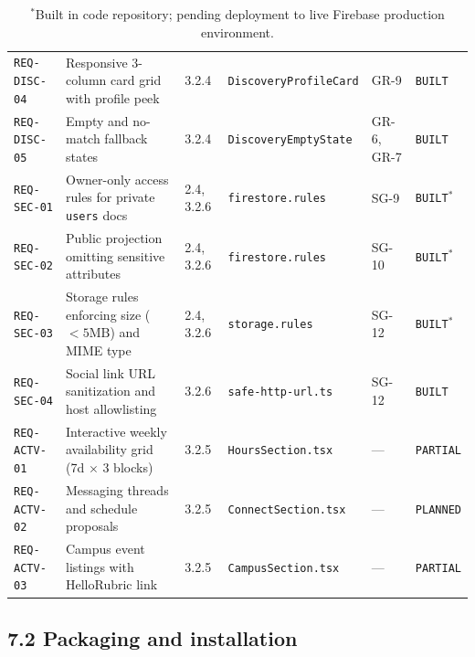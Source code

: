 \documentclass[11pt,letterpaper]{article}
\begin{document}
\begin{table}[h!]
\begin{tabularx}{\textwidth}{p{2.1cm} Y p{1.5cm} p{2.5cm} p{1.4cm} p{1.4cm}}
\texttt{REQ-DISC-04} & Responsive 3-column card grid with profile peek & 3.2.4 & \texttt{DiscoveryProfileCard} & GR-9 & \texttt{BUILT} \\
\texttt{REQ-DISC-05} & Empty and no-match fallback states & 3.2.4 & \texttt{DiscoveryEmptyState} & GR-6, GR-7 & \texttt{BUILT} \\
\texttt{REQ-SEC-01} & Owner-only access rules for private \texttt{users} docs & 2.4, 3.2.6 & \texttt{firestore.rules} & SG-9 & \texttt{BUILT}$^*$ \\
\texttt{REQ-SEC-02} & Public projection omitting sensitive attributes & 2.4, 3.2.6 & \texttt{firestore.rules} & SG-10 & \texttt{BUILT}$^*$ \\
\texttt{REQ-SEC-03} & Storage rules enforcing size ($<5\text{MB}$) and MIME type & 2.4, 3.2.6 & \texttt{storage.rules} & SG-12 & \texttt{BUILT}$^*$ \\
\texttt{REQ-SEC-04} & Social link URL sanitization and host allowlisting & 3.2.6 & \texttt{safe-http-url.ts} & SG-12 & \texttt{BUILT} \\
\texttt{REQ-ACTV-01} & Interactive weekly availability grid (7d $\times$ 3 blocks) & 3.2.5 & \texttt{HoursSection.tsx} & --- & \texttt{PARTIAL} \\
\texttt{REQ-ACTV-02} & Messaging threads and schedule proposals & 3.2.5 & \texttt{ConnectSection.tsx} & --- & \texttt{PLANNED} \\
\texttt{REQ-ACTV-03} & Campus event listings with HelloRubric link & 3.2.5 & \texttt{CampusSection.tsx} & --- & \texttt{PARTIAL} \\
\bottomrule
\end{tabularx}
\caption*{\footnotesize $^*$Built in code repository; pending deployment to live Firebase production environment.}
\end{table}

\subsection*{7.2 Packaging and installation}
\end{document}

